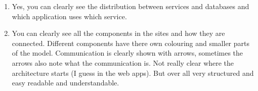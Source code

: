 \begin{enumerate}
	\item Yes, you can clearly see the distribution between services and databases and which application uses which service.
	
	\item You can clearly see all the components in the sites and how they are connected.
	Different components have there own colouring and smaller parts of the model.
	Communication is clearly shown with arrows, sometimes the arrows also note what the communication is.
	Not really clear where the architecture starts (I guess in the web apps).
	But over all very structured and easy readable and understandable.
\end{enumerate} 